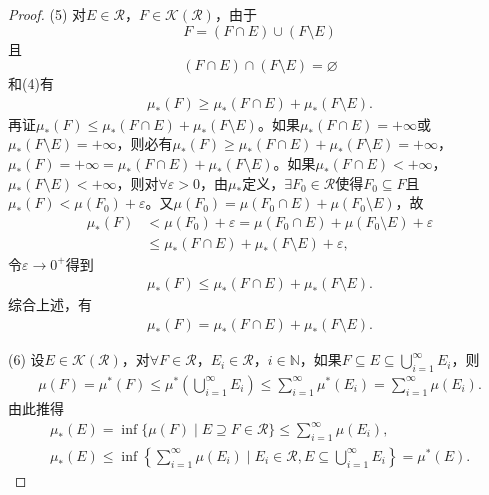\documentclass[../../main.tex]{subfiles}%
\begin{document}
\begin{proof}
(5) 对$E\in\mathscr{R}$，$F\in\mathscr{K}(\mathscr{R})$，由于
\[
F = (F\cap E)\cup (F\setminus E)
\]
且
\[
(F\cap E)\cap (F\setminus E) = \varnothing
\]
和(4)有
\begin{align*}
\mu_*(F)\geqslant \mu_*(F\cap E) + \mu_*(F\setminus E).
\end{align*}
再证$\mu_*(F)\leqslant \mu_*(F\cap E) + \mu_*(F\setminus E)$。如果$\mu_*(F\cap E)=+\infty$或$\mu_*(F\setminus E)=+\infty$，则必有$\mu_*(F)\geqslant \mu_*(F\cap E) + \mu_*(F\setminus E)=+\infty$，$\mu_*(F)=+\infty=\mu_*(F\cap E) + \mu_*(F\setminus E)$。如果$\mu_*(F\cap E)<+\infty$，$\mu_*(F\setminus E)<+\infty$，则对$\forall\varepsilon>0$，由$\mu_*$定义，$\exists F_0\in\mathscr{R}$使得$F_0\subseteq F$且$\mu_*(F)<\mu(F_0)+\varepsilon$。又$\mu(F_0)=\mu(F_0\cap E)+\mu(F_0\setminus E)$，故
\begin{align*}
\mu_*(F) &< \mu(F_0) + \varepsilon = \mu(F_0\cap E) + \mu(F_0\setminus E) + \varepsilon \\
&\leqslant \mu_*(F\cap E) + \mu_*(F\setminus E) + \varepsilon,
\end{align*}
令$\varepsilon\to 0^+$得到
\begin{align*}
\mu_*(F)\leqslant \mu_*(F\cap E) + \mu_*(F\setminus E).
\end{align*}
综合上述，有
\begin{align*}
\mu_*(F) = \mu_*(F\cap E) + \mu_*(F\setminus E).
\end{align*}

(6) 设$E\in\mathscr{K}(\mathscr{R})$，对$\forall F\in\mathscr{R}$，$E_i\in\mathscr{R}$，$i\in\mathbb{N}$，如果$F\subseteq E\subseteq \bigcup\limits_{i=1}^{\infty}E_i$，则
\begin{align*}
\mu(F) = \mu^*(F)\leqslant \mu^*\left(\bigcup\limits_{i=1}^{\infty}E_i\right)\leqslant \sum\limits_{i=1}^{\infty}\mu^*(E_i) = \sum\limits_{i=1}^{\infty}\mu(E_i).
\end{align*}
由此推得
\begin{align*}
\mu_*(E) = \inf\{\mu(F) \mid E\supseteq F\in\mathscr{R}\} \leqslant \sum\limits_{i=1}^{\infty}\mu(E_i), \\
\mu_*(E)\leqslant \inf\left\{\sum\limits_{i=1}^{\infty}\mu(E_i) \mid E_i\in\mathscr{R}, E\subseteq \bigcup\limits_{i=1}^{\infty}E_i\right\} = \mu^*(E).
\end{align*}

\end{proof}
\end{document}
